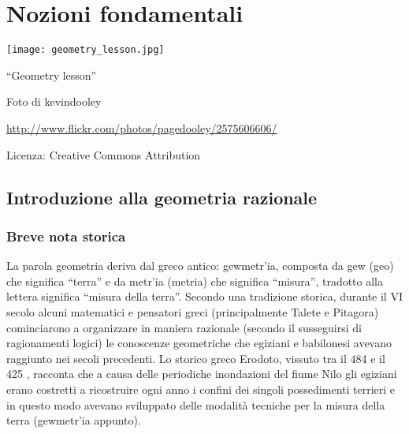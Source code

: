 
\chapter{Nozioni fondamentali}\label{chap:nozioni_fondamentali}

\texttt{[image: geometry\_lesson.jpg]}
  \begin{center}
    {\large ``Geometry lesson''}\par
    Foto di kevindooley\par
    \url{http://www.flickr.com/photos/pagedooley/2575606606/}\par
    Licenza: Creative Commons Attribution\par
  \end{center}
\newpage

\section{Introduzione alla geometria razionale}\label{sect:intro_geometria_razionale}
\subsection{Breve nota storica}
La parola geometria deriva dal greco antico: \textgreek{gewmetr'ia}, composta da \textgreek{gew} (geo) che significa ``terra'' e da \textgreek{metr'ia} (metria) che significa ``misura'', tradotto alla lettera significa ``misura della terra''. Secondo una tradizione storica, durante il VI secolo \aC{} alcuni matematici e pensatori greci (principalmente Talete e Pitagora) cominciarono a organizzare in maniera razionale (secondo il susseguirsi di ragionamenti logici) le conoscenze geometriche che egiziani e babilonesi avevano raggiunto nei secoli precedenti. Lo storico greco Erodoto, vissuto tra il 484 \aC{} e il 425 \aC, racconta che a causa delle periodiche inondazioni del fiume Nilo gli egiziani erano costretti a ricostruire ogni anno i confini dei singoli possedimenti terrieri e in questo modo avevano sviluppato delle modalità tecniche per la misura della terra (\textgreek{gewmetr'ia} appunto).

